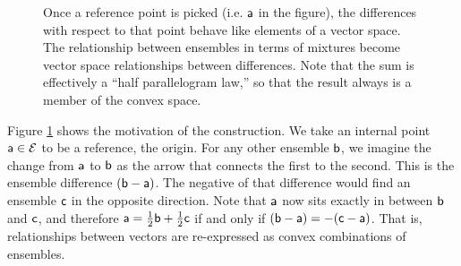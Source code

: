 \begin{figure}[H]
	\centering
	\caption{Once a reference point is picked (i.e. $\ens[a]$ in the figure), the differences with respect to that point behave like elements of a vector space. The relationship between ensembles in terms of mixtures become vector space relationships between differences. Note that the sum is effectively a ``half parallelogram law,'' so that the result always is a member of the convex space.}\label{pm-es-vectorJustification}
\end{figure}

Figure \ref{pm-es-vectorJustification} shows the motivation of the construction. We take an internal point $\ens[a] \in \Ens$ to be a reference, the origin. For any other ensemble $\ens[b]$, we imagine the change from $\ens[a]$ to $\ens[b]$ as the arrow that connects the first to the second. This is the ensemble difference $(\ens[b] - \ens[a])$. The negative of that difference would find an ensemble $\ens[c]$ in the opposite direction. Note that $\ens[a]$ now sits exactly in between $\ens[b]$ and $\ens[c]$, and therefore $\ens[a] = \frac{1}{2}\ens[b] + \frac{1}{2}\ens[c]$ if and only if $(\ens[b] - \ens[a]) = - (\ens[c]- \ens[a])$. That is, relationships between vectors are re-expressed as convex combinations of ensembles.

